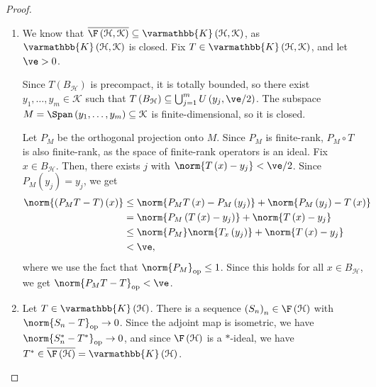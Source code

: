 \documentclass[10pt]{mypackage}
\renewcommand*{\mathbb}[1]{\varmathbb{#1}}
\newcommand{\K}{\mathbb{K}}
\begin{document}
\begin{proof}\hfill
  \begin{enumerate}[(1)]
    \item We know that $\overline{\F\left(\mathcal{H},\mathcal{K}\right)}\subseteq \mathbb{K}\left(\mathcal{H},\mathcal{K}\right)$, as $\mathbb{K}\left(\mathcal{H},\mathcal{K}\right)$ is closed. Fix $T\in \mathbb{K}\left(\mathcal{H},\mathcal{K}\right)$, and let $\ve > 0$.\newline

    Since $T\left(B_{\mathcal{H}}\right)$ is precompact, it is totally bounded, so there exist $y_1,\dots,y_m\in \mathcal{K}$ such that $T\left(B_{\mathcal{H}}\right)\subseteq \bigcup_{j=1}^{m}U\left(y_j,\ve/2\right)$. The subspace $M= \Span\left(y_1,\dots,y_m\right)\subseteq \mathcal{K}$ is finite-dimensional, so it is closed.\newline

    Let $P_M$ be the orthogonal projection onto $M$. Since $P_M$ is finite-rank, $P_M\circ T$ is also finite-rank, as the space of finite-rank operators is an ideal. Fix $x\in B_{\mathcal{H}}$. Then, there exists $j$ with $\norm{T\left(x\right) - y_j} < \ve/2$. Since $P_M\left(y_j\right) = y_j$, we get
    \begin{align*}
      \norm{\left(P_MT - T\right)\left(x\right)} &\leq \norm{P_MT\left(x\right) - P_M\left(y_j\right)} + \norm{P_M\left(y_j\right) - T\left(x\right)}\\
                                                 &= \norm{P_M\left(T\left(x\right) - y_j\right)} + \norm{T\left(x\right) - y_j}\\
                                                 &\leq \norm{P_M}\norm{T_x\left(y_j\right)} + \norm{T\left(x\right) - y_j}\\
                                                 &< \ve,
    \end{align*}
    where we use the fact that $\norm{P_M}_{\text{op}} \leq 1$. Since this holds for all $x\in B_{\mathcal{H}}$, we get $\norm{P_MT - T}_{\text{op}} < \ve$.
  \item Let $T\in \K\left(\mathcal{H}\right)$. There is a sequence $\left(S_n\right)_n\in \F\left(\mathcal{H}\right)$ with $\norm{S_n - T}_{\text{op}} \rightarrow 0$. Since the adjoint map is isometric, we have $\norm{S_n^{\ast} - T^{\ast}}_{\text{op}}\rightarrow 0$, and since $\F\left(\mathcal{H}\right)$ is a $\ast$-ideal, we have $T^{\ast}\in \overline{\F\left(\mathcal{H}\right)} = \K\left(\mathcal{H}\right)$.
  \end{enumerate}
\end{proof}
\end{document}
